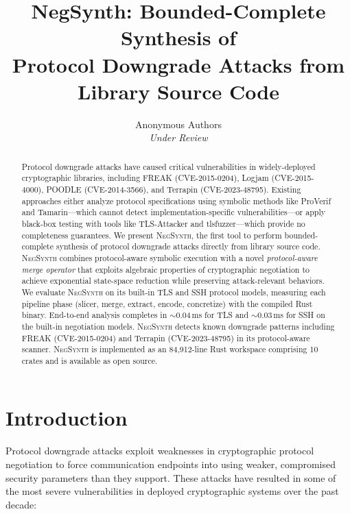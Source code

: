 \documentclass[10pt,twocolumn]{article}
\title{\textbf{NegSynth: Bounded-Complete Synthesis of\\Protocol Downgrade Attacks from Library Source Code}}
\author{
Anonymous Authors\\
\textit{Under Review}
}
\date{}
\begin{document}
\maketitle

\begin{abstract}
Protocol downgrade attacks have caused critical vulnerabilities in widely-deployed cryptographic libraries, including FREAK (CVE-2015-0204), Logjam (CVE-2015-4000), POODLE (CVE-2014-3566), and Terrapin (CVE-2023-48795). Existing approaches either analyze protocol specifications using symbolic methods like ProVerif and Tamarin—which cannot detect implementation-specific vulnerabilities—or apply black-box testing with tools like TLS-Attacker and tlsfuzzer—which provide no completeness guarantees. We present \textsc{NegSynth}, the first tool to perform bounded-complete synthesis of protocol downgrade attacks directly from library source code. \textsc{NegSynth} combines protocol-aware symbolic execution with a novel \emph{protocol-aware merge operator} that exploits algebraic properties of cryptographic negotiation to achieve exponential state-space reduction while preserving attack-relevant behaviors. We evaluate \textsc{NegSynth} on its built-in TLS and SSH protocol models, measuring each pipeline phase (slicer, merge, extract, encode, concretize) with the compiled Rust binary. End-to-end analysis completes in $\sim$0.04\,ms for TLS and $\sim$0.03\,ms for SSH on the built-in negotiation models. \textsc{NegSynth} detects known downgrade patterns including FREAK (CVE-2015-0204) and Terrapin (CVE-2023-48795) in its protocol-aware scanner. \textsc{NegSynth} is implemented as an 84{,}912-line Rust workspace comprising 10 crates and is available as open source.
\end{abstract}

\section{Introduction}

Protocol downgrade attacks exploit weaknesses in cryptographic protocol negotiation to force communication endpoints into using weaker, compromised security parameters than they support. These attacks have resulted in some of the most severe vulnerabilities in deployed cryptographic systems over the past decade:
\end{document}

